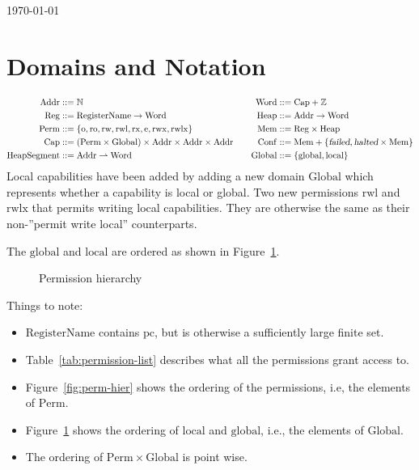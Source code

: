 \documentclass[a4paper]{article}
\newcommand{\parfun}{\rightharpoonup}
\newcommand{\pcreg}{\mathrm{pc}}
\newcommand{\failed}{\textsl{failed}}
\newcommand{\halted}{\textsl{halted}}
\newcommand{\plaindom}[1]{\mathrm{#1}}
\newcommand{\Caps}{\plaindom{Cap}}
\newcommand{\Words}{\plaindom{Word}}
\newcommand{\Addrs}{\plaindom{Addr}}
\newcommand{\Mems}{\plaindom{Mem}}
\newcommand{\RegName}{\plaindom{RegisterName}}
\newcommand{\Regs}{\plaindom{Reg}}
\newcommand{\Heaps}{\plaindom{Heap}}
\newcommand{\HeapSegments}{\plaindom{HeapSegment}}
\newcommand{\Confs}{\plaindom{Conf}}
\newcommand{\nats}{\mathbb{N}}
\newcommand{\ints}{\mathbb{Z}}
\newcommand{\Perms}{\plaindom{Perm}}
\newcommand{\Globals}{\plaindom{Global}}
\newcommand{\plainperm}[1]{\mathrm{#1}}
\newcommand{\noperm}{\plainperm{o}}
\newcommand{\readonly}{\plainperm{ro}}
\newcommand{\readwrite}{\plainperm{rw}}
\newcommand{\exec}{\plainperm{rx}}
\newcommand{\entry}{\plainperm{e}}
\newcommand{\rwx}{\plainperm{rwx}}
\newcommand{\readwritel}{\plainperm{rwl}}
\newcommand{\rwlx}{\plainperm{rwlx}}
\newcommand{\local}{\plainperm{local}}
\newcommand{\glob}{\plainperm{global}}
\begin{document}
\begin{flushright}
\today
\end{flushright}
\section{Domains and Notation}
\begin{align*}
\Addrs &::= \nats & & &
\Words &::= \Caps + \ints \\
\Regs  &::= \RegName \rightarrow \Words & & &
\Heaps &::= \Addrs \rightarrow \Words \\
\Perms &::= \{ \noperm, \readonly, \readwrite, \readwritel, \exec, \entry, \rwx, \rwlx\} & & &
\Mems  &::= \Regs \times \Heaps \\
\Caps  &::= (\Perms \times \Globals) \times \Addrs \times \Addrs \times \Addrs & & &
\Confs &::= \Mems + \{\failed, \halted \times \Mems\} \\
\HeapSegments &::= \Addrs \parfun \Words & & &
\Globals & ::= \{\glob, \local \}
\end{align*}
Local capabilities have been added by adding a new domain $\Globals$ which represents whether a capability is local or global. Two new permissions $\readwritel$ and $\rwlx$ that permits writing local capabilities. They are otherwise the same as their non-''permit write local'' counterparts.

The $\glob$ and $\local$ are ordered as shown in Figure~\ref{fig:glob-hier}.
\begin{figure}[!h]
  \centering
\caption{Permission hierarchy}
\label{fig:glob-hier}
\end{figure}

Things to note:
\begin{itemize}
\item $\RegName$ contains $\pcreg$, but is otherwise a sufficiently
  large finite set.
\item Table~\ref{tab:permission-list} describes what all the permissions grant access to.
\item Figure~\ref{fig:perm-hier} shows the ordering of the permissions, i.e, the elements of $\Perms$.
\item Figure~\ref{fig:glob-hier} shows the ordering of $\local$ and $\glob$, i.e., the elements of $\Globals$.
\item The ordering of $\Perms \times \Globals$ is point wise.
\end{itemize}
\end{document}
